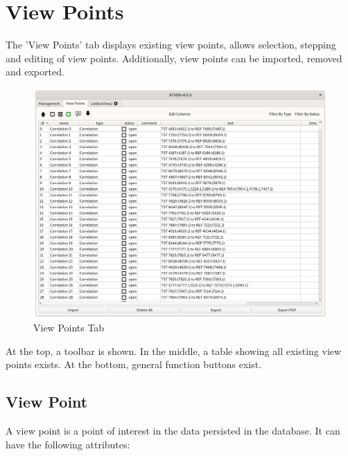\chapter{View Points}
\label{sec:view_points} 

The 'View Points' tab displays existing view points, allows selection, stepping and editing of view points. Additionally, view points can be imported, removed and exported.

\begin{figure}[H]
    \hspace*{-2.5cm}
    \includegraphics[width=19cm]{figures/view_points.png}
  \caption{View Points Tab}
\end{figure}

At the top, a toolbar is shown. In the middle, a table showing all existing view points exists. At the bottom, general function buttons exist. \\

\section{View Point}

A view point is a point of interest in the data persisted in the database. It can have the following attributes:

